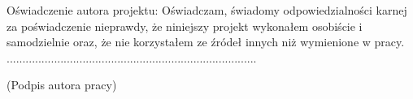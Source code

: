 \vspace*{\fill}
\begingroup
\noindent
Oświadczenie autora projektu:\vspace{15pt}\newline
\noindent
Oświadczam, świadomy odpowiedzialności karnej za poświadczenie nieprawdy, że niniejszy projekt wykonałem osobiście i samodzielnie oraz, że nie korzystałem ze źródeł innych niż wymienione w pracy.\vspace{25pt}\newline
...............................................................................

\hspace{50pt}(Podpis autora pracy)
\endgroup
\vspace*{\fill}
